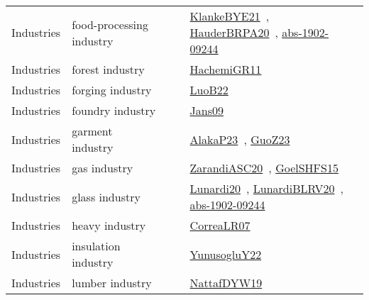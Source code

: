 {\begin{longtable}{lp{3cm}>{\raggedright\arraybackslash}p{6cm}>{\raggedright\arraybackslash}p{6cm}>{\raggedright\arraybackslash}p{8cm}}
\index{food-processing industry}\index{Industries!food-processing industry}Industries & food-processing industry &  &  & \href{../works/KlankeBYE21.pdf}{KlankeBYE21}~\cite{KlankeBYE21}, \href{../works/HauderBRPA20.pdf}{HauderBRPA20}~\cite{HauderBRPA20}, \href{../works/abs-1902-09244.pdf}{abs-1902-09244}~\cite{abs-1902-09244}\\
\index{forest industry}\index{Industries!forest industry}Industries & forest industry &  &  & \href{../works/HachemiGR11.pdf}{HachemiGR11}~\cite{HachemiGR11}\\
\index{forging industry}\index{Industries!forging industry}Industries & forging industry &  &  & \href{../works/LuoB22.pdf}{LuoB22}~\cite{LuoB22}\\
\index{foundry industry}\index{Industries!foundry industry}Industries & foundry industry &  &  & \href{../works/Jans09.pdf}{Jans09}~\cite{Jans09}\\
\index{garment industry}\index{Industries!garment industry}Industries & garment industry &  &  & \href{../works/AlakaP23.pdf}{AlakaP23}~\cite{AlakaP23}, \href{../works/GuoZ23.pdf}{GuoZ23}~\cite{GuoZ23}\\
\index{gas industry}\index{Industries!gas industry}Industries & gas industry &  &  & \href{../works/ZarandiASC20.pdf}{ZarandiASC20}~\cite{ZarandiASC20}, \href{../works/GoelSHFS15.pdf}{GoelSHFS15}~\cite{GoelSHFS15}\\
\index{glass industry}\index{Industries!glass industry}Industries & glass industry &  &  & \href{../works/Lunardi20.pdf}{Lunardi20}~\cite{Lunardi20}, \href{../works/LunardiBLRV20.pdf}{LunardiBLRV20}~\cite{LunardiBLRV20}, \href{../works/abs-1902-09244.pdf}{abs-1902-09244}~\cite{abs-1902-09244}\\
\index{heavy industry}\index{Industries!heavy industry}Industries & heavy industry &  &  & \href{../works/CorreaLR07.pdf}{CorreaLR07}~\cite{CorreaLR07}\\
\index{insulation industry}\index{Industries!insulation industry}Industries & insulation industry &  &  & \href{../works/YunusogluY22.pdf}{YunusogluY22}~\cite{YunusogluY22}\\
\index{lumber industry}\index{Industries!lumber industry}Industries & lumber industry &  &  & \href{../works/NattafDYW19.pdf}{NattafDYW19}~\cite{NattafDYW19}\\

\end{longtable}}

